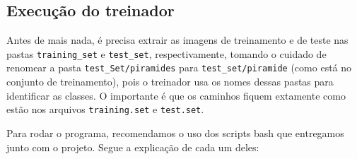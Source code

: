 \documentclass[a4paper,11pt]{article}
\begin{document}
  \subsection{Execução do treinador}

    Antes de mais nada, é precisa extrair as imagens de treinamento e de teste
    nas pastas \verb$training_set$ e \verb$test_set$, respectivamente, tomando o
    cuidado de renomear a pasta \verb$test_Set/piramides$ para
    \verb$test_set/piramide$ (como está no conjunto de treinamento), pois o
    treinador usa os nomes dessas pastas para identificar as classes. O
    importante é que os caminhos fiquem extamente como estão nos arquivos
    \verb$training.set$ e \verb$test.set$.

    Para rodar o programa, recomendamos o uso dos scripts bash que entregamos
    junto com o projeto. Segue a explicação de cada um deles:
\end{document}

